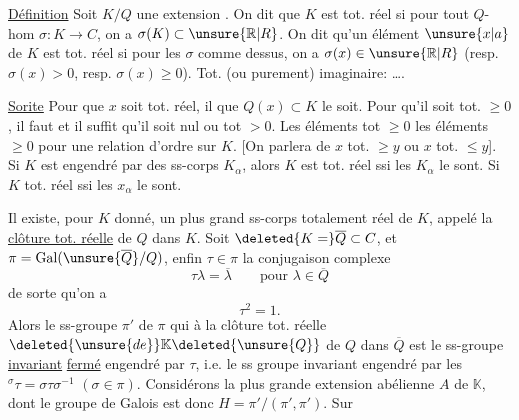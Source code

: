 \uline{Définition} Soit $K/Q$ une extension  . On dit que $K$ est tot. réel si pour tout $Q$-hom $\sigma:K\to C$, on a $\sigma(K)\subset\unsure{\mathbb R|R}$. On dit qu'un élément $\unsure{x|a}$ de $K$ est tot. réel  si pour les $\sigma$ comme dessus, on a $\sigma(x)\in\unsure{\mathbb R|R}$ (resp. $\sigma(x)>0$, resp. $\sigma(x)\ge0$). Tot. (ou purement) imaginaire: \ldots.

\uline{Sorite} Pour que $x$ soit tot. réel, il  que $Q(x)\subset K$ le soit. Pour qu'il soit tot. $\ge0$, il faut et il suffit qu'il soit nul ou tot $>0$. Les éléments tot $\ge0$   les éléments $\ge0$ pour une relation d'ordre sur $K$. [On parlera de $x$ tot. $\ge y$ ou $x$ tot. $\le y$]. Si $K$ est engendré par des ss-corps $K_\alpha$, alors $K$ est tot. réel ssi les $K_\alpha$ le sont. Si  $K$ tot. réel ssi  les $x_\alpha$ le sont.

Il existe, pour $K$ donné, un plus grand ss-corps totalement réel de $K$, appelé la \uline{clôture tot. réelle} de $Q$ dans $K$. Soit $\deleted{K=}\overline Q\subset C$, et $\pi=\operatorname{Gal}(\unsure{\overline Q}/Q)$, enfin $\tau\in\pi$ la conjugaison complexe
\[
\tau\lambda=\overline\lambda\qquad\text{pour }\lambda\in\overline Q
\]
de sorte qu'on a
\[
\tau^2=1.
\]
Alors le ss-groupe $\pi'$ de $\pi$ qui   à la clôture tot. réelle $\deleted{\unsure{de}}\mathbb K\deleted{\unsure{Q}}$ de $Q$ dans $\overline Q$ est  le ss-groupe \uline{invariant} \uline{fermé} engendré par $\tau$, i.e. le ss groupe invariant engendré par les ${}^{\sigma}\tau=\sigma\tau\sigma^{-1}$ $(\sigma\in\pi)$.
Considérons la plus grande extension abélienne $A$ de $\mathbb K$, dont le groupe de Galois est donc $H=\pi'/(\pi',\pi')$.  Sur
